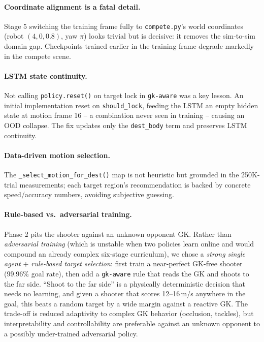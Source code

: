 \documentclass{article}
\newcommand{\code}[1]{\texttt{#1}}
\begin{document}
\paragraph{Coordinate alignment is a fatal detail.} Stage 5 switching the
training frame fully to \code{compete.py}'s world coordinates
(robot $(4,0,0.8)$, yaw $\pi$) looks trivial but is decisive: it removes the
sim-to-sim domain gap. Checkpoints trained earlier in the training frame degrade
markedly in the compete scene.

\paragraph{LSTM state continuity.} Not calling \code{policy.reset()} on target
lock in \code{gk-aware} was a key lesson. An initial implementation reset on
\code{should_lock}, feeding the LSTM an empty hidden state at motion frame 16 -- a
combination never seen in training -- causing an OOD collapse. The fix updates
only the \code{dest_body} term and preserves LSTM continuity.

\paragraph{Data-driven motion selection.} The \code{_select_motion_for_dest()}
map is not heuristic but grounded in the 250K-trial measurements; each target
region's recommendation is backed by concrete speed/accuracy numbers, avoiding
subjective guessing.

\paragraph{Rule-based vs.\ adversarial training.} Phase 2 pits the shooter against
an unknown opponent GK. Rather than \emph{adversarial training} (which is
unstable when two policies learn online and would compound an already complex
six-stage curriculum), we chose a \emph{strong single agent $+$ rule-based target
selection}: first train a near-perfect GK-free shooter (99.96\% goal rate), then
add a \code{gk-aware} rule that reads the GK and shoots to the far side. ``Shoot
to the far side'' is a physically deterministic decision that needs no learning,
and given a shooter that scores 12--16\,m/s anywhere in the goal, this beats a
random target by a wide margin against a reactive GK. The trade-off is reduced
adaptivity to complex GK behavior (occlusion, tackles), but interpretability and
controllability are preferable against an unknown opponent to a possibly
under-trained adversarial policy.
\end{document}
